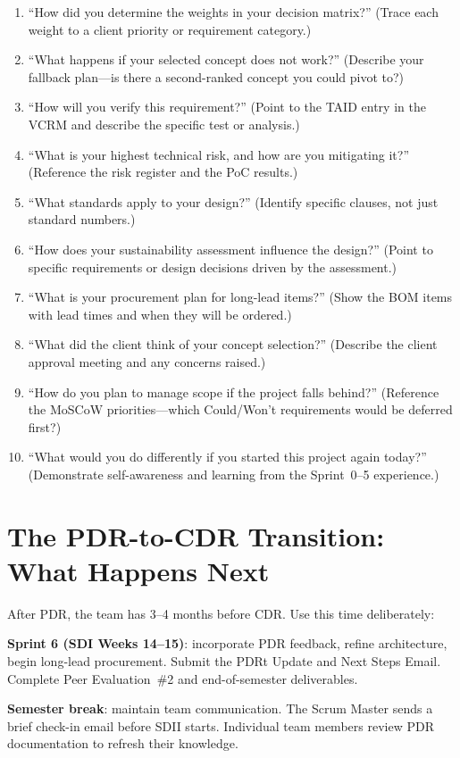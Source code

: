 \begin{enumerate}[nosep,leftmargin=1.5em]
\item ``How did you determine the weights in your decision matrix?'' (Trace each weight to a client priority or requirement category.)
\item ``What happens if your selected concept does not work?'' (Describe your fallback plan---is there a second-ranked concept you could pivot to?)
\item ``How will you verify this requirement?'' (Point to the TAID entry in the VCRM and describe the specific test or analysis.)
\item ``What is your highest technical risk, and how are you mitigating it?'' (Reference the risk register and the PoC results.)
\item ``What standards apply to your design?'' (Identify specific clauses, not just standard numbers.)
\item ``How does your sustainability assessment influence the design?'' (Point to specific requirements or design decisions driven by the assessment.)
\item ``What is your procurement plan for long-lead items?'' (Show the BOM items with lead times and when they will be ordered.)
\item ``What did the client think of your concept selection?'' (Describe the client approval meeting and any concerns raised.)
\item ``How do you plan to manage scope if the project falls behind?'' (Reference the MoSCoW priorities---which Could/Won't requirements would be deferred first?)
\item ``What would you do differently if you started this project again today?'' (Demonstrate self-awareness and learning from the Sprint~0--5 experience.)
\end{enumerate}



\section{The PDR-to-CDR Transition: What Happens Next}
After PDR, the team has 3--4 months before CDR. Use this time deliberately:

\textbf{Sprint 6 (SDI Weeks 14--15)}: incorporate PDR feedback, refine architecture, begin long-lead procurement. Submit the PDRt Update and Next Steps Email. Complete Peer Evaluation~\#2 and end-of-semester deliverables.

\textbf{Semester break}: maintain team communication. The Scrum Master sends a brief check-in email before SDII starts. Individual team members review PDR documentation to refresh their knowledge.

